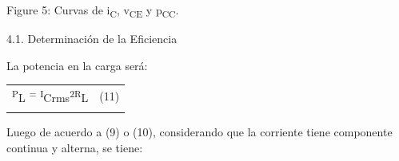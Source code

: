 \documentclass[12pt]{article}
\begin{document}
\vspace{\baselineskip}
\begin{adjustwidth}{0.0in}{0.01in}
\begin{Center}
Figure 5: Curvas de i\textsubscript{C}, v\textsubscript{CE} y p\textsubscript{CC}.
\end{Center}\par

\end{adjustwidth}


\vspace{\baselineskip}

\vspace{\baselineskip}
\begin{adjustwidth}{0.86in}{0.0in}
\textcolor[HTML]{5C2D91}{4.1. Determinación de la Eficiencia}\par

\end{adjustwidth}


\vspace{\baselineskip}
\begin{adjustwidth}{0.86in}{0.0in}
La potencia en la carga será:\par

\end{adjustwidth}


\vspace{\baselineskip}




\begin{table}[H]
 			\centering
\begin{tabular}{p{1.55in}p{0.88in}}
\multicolumn{1}{p{1.55in}}{\textsuperscript{P}{\fontsize{7pt}{8.4pt}\selectfont L \textsuperscript{=} \textsuperscript{I}Crms\textsuperscript{2R}L}} & 
\multicolumn{1}{p{0.88in}}{(11)} \\
\hhline{~~}

\end{tabular}
 \end{table}



\begin{adjustwidth}{0.86in}{0.88in}
\begin{justify}
Luego de acuerdo a (9) o (10), considerando que la corriente tiene componente continua y alterna, se tiene:
\end{justify}\par

\end{adjustwidth}
\end{document}
